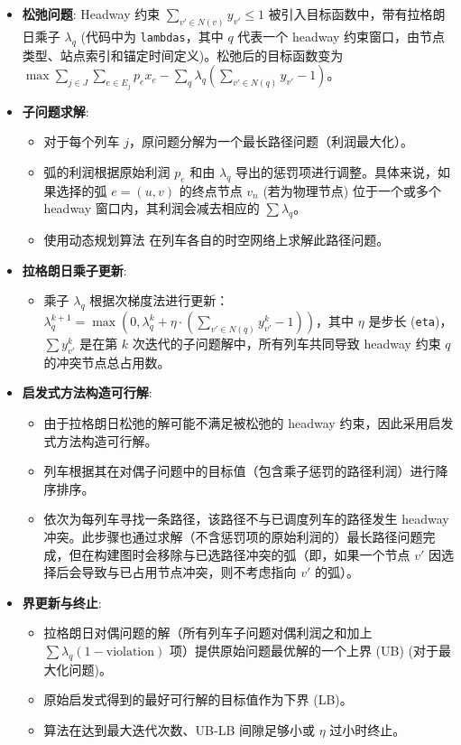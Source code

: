 \documentclass{article}
\begin{document}
\begin{itemize}
    \item \textbf{松弛问题}: Headway 约束 $\sum_{v' \in N(v)} y_{v'} \le 1$
        被引入目标函数中，带有拉格朗日乘子 $\lambda_q$
        (代码中为 \texttt{lambdas}，其中 $q$ 代表一个 headway
        约束窗口，由节点类型、站点索引和锚定时间定义)。松弛后的目标函数变为 $\max
        \sum_{j \in J} \sum_{e \in E_j} p_e x_e - \sum_q \lambda_q
        (\sum_{v' \in N(q)} y_{v'} - 1)$。
    \item \textbf{子问题求解}:
        \begin{itemize}
            \item 对于每个列车 $j$，原问题分解为一个最长路径问题（利润最大化）。
            \item 弧的利润根据原始利润 $p_e$ 和由 $\lambda_q$
                导出的惩罚项进行调整。具体来说，如果选择的弧 $e=(u,v)$ 的终点节点 $v_n$ (若为物理节点)
                位于一个或多个 headway 窗口内，其利润会减去相应的 $\sum \lambda_q$。
            \item 使用动态规划算法 在列车各自的时空网络上求解此路径问题。
        \end{itemize}
    \item \textbf{拉格朗日乘子更新}:
        \begin{itemize}
            \item 乘子 $\lambda_q$ 根据次梯度法进行更新： $\lambda_q^{k+1} =
                \max(0, \lambda_q^k + \eta \cdot (\sum_{v' \in N(q)}
                y_{v'}^{k} - 1))$，其中 $\eta$ 是步长 (\texttt{eta})，$\sum
                y_{v'}^{k}$ 是在第 $k$ 次迭代的子问题解中，所有列车共同导致 headway 约束 $q$
                的冲突节点总占用数。
        \end{itemize}
    \item \textbf{启发式方法构造可行解}:
        \begin{itemize}
            \item 由于拉格朗日松弛的解可能不满足被松弛的 headway 约束，因此采用启发式方法构造可行解。
            \item 列车根据其在对偶子问题中的目标值（包含乘子惩罚的路径利润）进行降序排序。
            \item 依次为每列车寻找一条路径，该路径不与已调度列车的路径发生 headway
                冲突。此步骤也通过求解（不含惩罚项的原始利润的）最长路径问题完成，但在构建图时会移除与已选路径冲突的弧（即，如果一个节点
                $v'$ 因选择后会导致与已占用节点冲突，则不考虑指向 $v'$ 的弧）。
        \end{itemize}
    \item \textbf{界更新与终止}:
        \begin{itemize}
            \item 拉格朗日对偶问题的解（所有列车子问题对偶利润之和加上 $\sum \lambda_q (1 -
                \text{violation})$ 项）提供原始问题最优解的一个上界 (UB) (对于最大化问题)。
            \item 原始启发式得到的最好可行解的目标值作为下界 (LB)。
            \item 算法在达到最大迭代次数、UB-LB 间隙足够小或 $\eta$ 过小时终止。
        \end{itemize}
\end{itemize}
\end{document}
